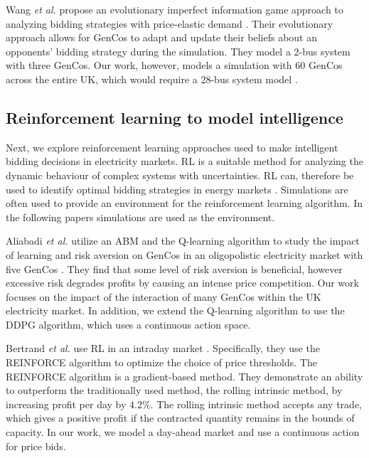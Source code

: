 Wang \textit{et al.} propose an evolutionary imperfect information game approach to analyzing bidding strategies with price-elastic demand \cite{Wang2011}. Their evolutionary approach allows for GenCos to adapt and update their beliefs about an opponents' bidding strategy during the simulation. They model a 2-bus system with three GenCos. Our work, however, models a simulation with 60 GenCos across the entire UK, which would require a 28-bus system model \cite{Bell2010}. 

\subsection{Reinforcement learning to model intelligence}

Next, we explore reinforcement learning approaches used to make intelligent bidding decisions in electricity markets. RL is a suitable method for analyzing the dynamic behaviour of complex systems with uncertainties. RL can, therefore be used to identify optimal bidding strategies in energy markets \cite{Yang2020}. Simulations are often used to provide an environment for the reinforcement learning algorithm. In the following papers simulations are used as the environment.


Aliabadi \textit{et al.} utilize an ABM and the Q-learning algorithm to study the impact of learning and risk aversion on GenCos in an oligopolistic electricity market with five GenCos \cite{EsmaeiliAliabadi2017}. They find that some level of risk aversion is beneficial, however excessive risk degrades profits by causing an intense price competition. Our work focuses on the impact of the interaction of many GenCos within the UK electricity market. In addition, we extend the Q-learning algorithm to use the DDPG algorithm, which uses a continuous action space.

Bertrand \textit{et al.} use RL in an intraday market \cite{Bertrand2019}. Specifically, they use the REINFORCE algorithm to optimize the choice of price thresholds. The REINFORCE algorithm is a gradient-based method. They demonstrate an ability to outperform the traditionally used method, the rolling intrinsic method, by increasing profit per day by 4.2\%. The rolling intrinsic method accepts any trade, which gives a positive profit if the contracted quantity remains in the bounds of capacity. In our work, we model a day-ahead market and use a continuous action for price bids.

